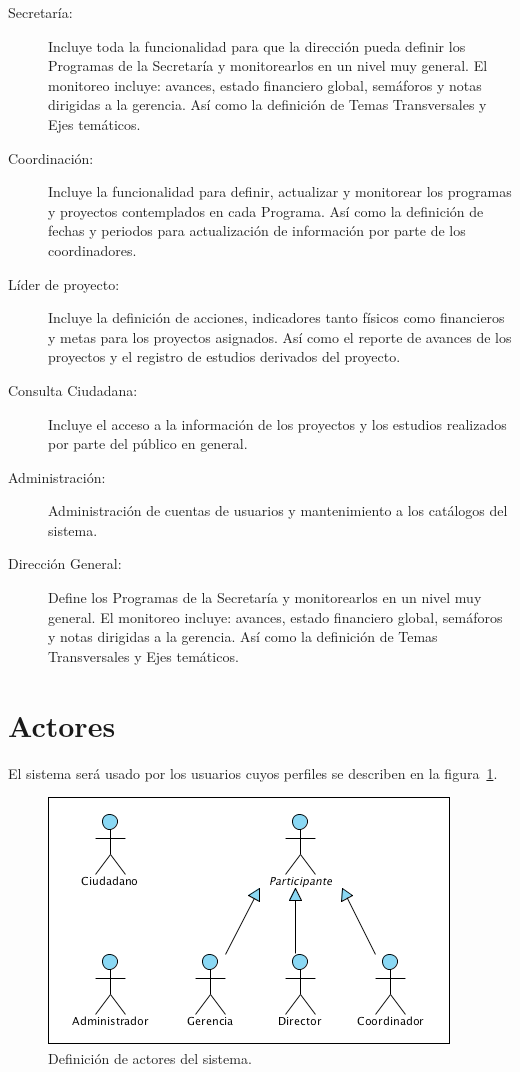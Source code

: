 \documentclass[10pt]{book}
\begin{document}
\begin{description}
	\item[Secretaría:] Incluye toda la funcionalidad para que la dirección pueda definir los Programas de la Secretaría y monitorearlos en un nivel muy general. El monitoreo incluye: avances, estado financiero global, semáforos y notas dirigidas a la gerencia. Así como la definición de Temas Transversales y Ejes temáticos.
	\item[Coordinación:] Incluye la funcionalidad para definir, actualizar y monitorear los programas y proyectos contemplados en cada Programa. Así como la definición de fechas y periodos para actualización de información por parte de los coordinadores.
	\item[Líder de proyecto:] Incluye la definición de acciones, indicadores tanto físicos como financieros y metas para los proyectos asignados. Así como el reporte de avances de los proyectos y el registro de estudios derivados del proyecto.
	\item[Consulta Ciudadana:] Incluye el acceso a la información de los proyectos y los estudios realizados por parte del público en general.
	\item[Administración:] Administración de cuentas de usuarios y mantenimiento a los catálogos del sistema.
	\item[Dirección General:] Define los Programas de la Secretaría y monitorearlos en un nivel muy general. El monitoreo incluye: avances, estado financiero global, semáforos y notas dirigidas a la gerencia. Así como la definición de Temas Transversales y Ejes temáticos.
\end{description}

\section{Actores}

El sistema será usado por los usuarios cuyos perfiles se describen en la figura~\ref{fig:actores}.

\begin{figure}[htbp!]
	\begin{center}
		\includegraphics[width=.5\textwidth]{images/actores}
		\caption{Definición de actores del sistema.}
		\label{fig:actores}
	\end{center}
\end{figure}
\end{document}
